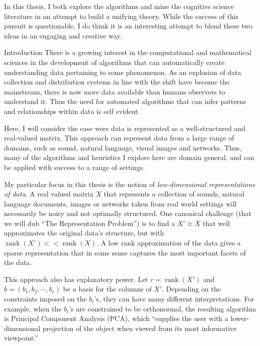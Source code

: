 \documentclass[12pt]{pom_thesis}
\begin{document}
In this thesis, I both explore the algorithms and mine the cognitive science literature in an attempt to build a unifying theory. While the success of this pursuit is questionable, I do think it is an interesting attempt to blend these two ideas in an engaging and creative way.
\begin{chapter}{Introduction}
	There is a growing interest in the computational and mathematical sciences in the development of algorithms that can automatically create understanding  data pertaining to some phenomenon. As an explosion of data collection and distribution systems in line with the shift have become the mainstream, there is now more data available than humans observers to understand it. Thus the need for automated algorithms that can infer patterns and relationships within data is self evident. 
	
	Here, I will consider the case were data is represented as a well-structured and  real-valued matrix. This approach can represent data from a large range of domains, such as sound, natural language, visual images and networks. Thus, many of the algorithms and heuristics I explore here are domain general, and can be applied with success to a range of settings. 
	
	My particular focus in this thesis is the notion of \textit{low-dimensional representations of data}. A real valued matrix $X$ that represents a collection of sounds, natural language documents, images or networks taken from real world settings will necessarily be noisy and not optimally structured. One canonical challenge (that we will dub ``The Representation Problem'') is to find a $X' \approx X$ that well approximates the original data's structure, but with $\operatorname{rank}(X') << \operatorname{rank}(X)$. A low rank approximation of the data gives a sparse representation that in some sense captures the most important facets of the data. 
	
	This approach also has explanatory power. Let $r = \operatorname{rank}(X')$ and $b= (b_1,b_2,\cdots,b_r)$ be a basis for the columns of $X'$. Depending on the constraints imposed on the $b_i$'s, they can have many different interpretations. For example, when the $b_i$'s are constrained to be orthonormal, the resulting algorithm is Principal Component Analysis (PCA), which ``supplies the user with a lower-dimensional projection of the object when viewed from its most informative viewpoint.'' \cite{jolliffe2002principal}
	

\end{chapter}
\end{document}
